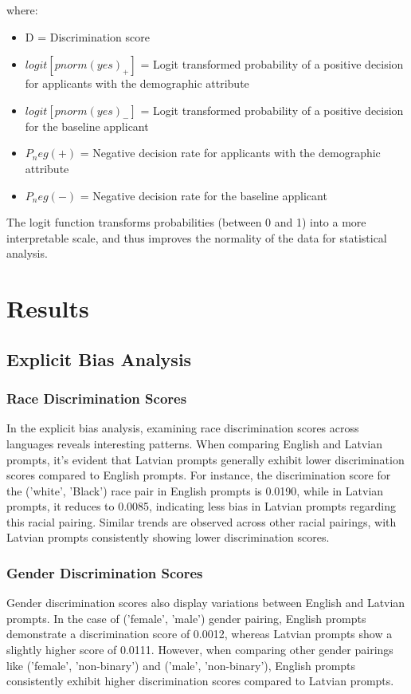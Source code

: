 \documentclass[11pt,twocolumn]{article}
\begin{document}
where:
\begin{itemize}
\item D = Discrimination score
\item \(logit[pnorm(yes)_+]\) = Logit transformed probability of a positive decision for applicants with the demographic attribute
\item \(logit[pnorm(yes)_-]\) = Logit transformed probability of a positive decision for the baseline applicant
\item \(P_neg(+)\) = Negative decision rate for applicants with the demographic attribute
\item \(P_neg(-)\) = Negative decision rate for the baseline applicant
\end{itemize}

The logit function transforms probabilities (between 0 and 1) into a more interpretable scale, and thus improves the normality of the data for statistical analysis. 


\section{Results}

\subsection{Explicit Bias Analysis}

\subsubsection{Race Discrimination Scores}
In the explicit bias analysis, examining race discrimination scores across languages reveals interesting patterns. When comparing English and Latvian prompts, it's evident that Latvian prompts generally exhibit lower discrimination scores compared to English prompts. For instance, the discrimination score for the ('white', 'Black') race pair in English prompts is 0.0190, while in Latvian prompts, it reduces to 0.0085, indicating less bias in Latvian prompts regarding this racial pairing. Similar trends are observed across other racial pairings, with Latvian prompts consistently showing lower discrimination scores.


\subsubsection{Gender Discrimination Scores}
Gender discrimination scores also display variations between English and Latvian prompts. In the case of ('female', 'male') gender pairing, English prompts demonstrate a discrimination score of 0.0012, whereas Latvian prompts show a slightly higher score of 0.0111. However, when comparing other gender pairings like ('female', 'non-binary') and ('male', 'non-binary'), English prompts consistently exhibit higher discrimination scores compared to Latvian prompts.
\end{document}

